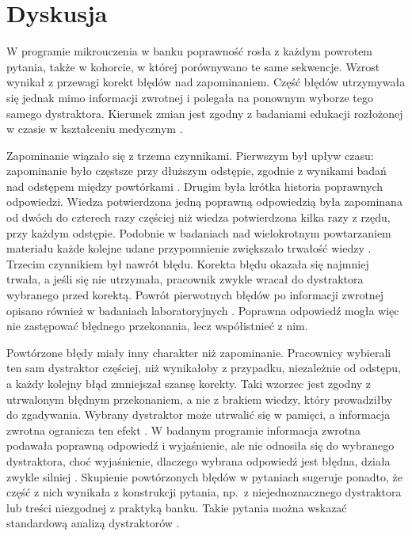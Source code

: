 \section{Dyskusja}

W programie mikrouczenia w banku poprawność rosła z każdym powrotem pytania, także w kohorcie, w której
porównywano te same sekwencje. Wzrost wynikał z przewagi korekt błędów nad zapominaniem. Część błędów
utrzymywała się jednak mimo informacji zwrotnej i polegała na ponownym wyborze tego samego dystraktora.
Kierunek zmian jest zgodny z badaniami edukacji rozłożonej w czasie w kształceniu medycznym
\citep{kerfoot2009,phillips2019}.

Zapominanie wiązało się z trzema czynnikami. Pierwszym był upływ czasu: zapominanie było częstsze przy
dłuższym odstępie, zgodnie z wynikami badań nad odstępem między powtórkami \citep{cepeda2006}. Drugim
była krótka historia poprawnych odpowiedzi. Wiedza potwierdzona jedną poprawną odpowiedzią była
zapominana od dwóch do czterech razy częściej niż wiedza potwierdzona kilka razy z rzędu, przy każdym
odstępie.
Podobnie w badaniach nad wielokrotnym powtarzaniem materiału każde kolejne udane przypomnienie
zwiększało trwałość wiedzy \citep{rawson2013}. Trzecim czynnikiem był nawrót błędu. Korekta błędu
okazała się najmniej trwała, a jeśli się nie utrzymała, pracownik zwykle wracał do dystraktora
wybranego przed korektą. Powrót pierwotnych błędów po informacji zwrotnej opisano również w badaniach
laboratoryjnych \citep{butler2011}. Poprawna odpowiedź mogła więc nie zastępować błędnego przekonania,
lecz współistnieć z nim.

Powtórzone błędy miały inny charakter niż zapominanie. Pracownicy wybierali ten sam dystraktor
częściej, niż wynikałoby z przypadku, niezależnie od odstępu, a każdy kolejny błąd zmniejszał szansę
korekty. Taki wzorzec jest zgodny z utrwalonym błędnym przekonaniem, a nie z brakiem wiedzy, który
prowadziłby do zgadywania. Wybrany dystraktor może utrwalić się w pamięci, a informacja zwrotna
ogranicza ten efekt \citep{butler2008}. W badanym programie informacja zwrotna podawała poprawną
odpowiedź i wyjaśnienie, ale nie odnosiła się do wybranego dystraktora, choć wyjaśnienie, dlaczego
wybrana odpowiedź jest błędna, działa zwykle silniej \citep{shute2008}. Skupienie powtórzonych błędów
w \PersistTopItems{} pytaniach sugeruje ponadto, że część z nich wynikała z konstrukcji pytania, np.\
z niejednoznacznego dystraktora lub treści niezgodnej z praktyką banku. Takie pytania można wskazać
standardową analizą dystraktorów \citep{gierl2017}.

